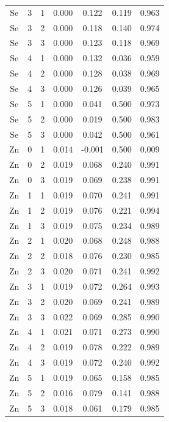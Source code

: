 \documentclass[ms, hidelinks]{uncgdissertationexp}
\theoremstyle{plain}
\theoremstyle{definition}
\theoremstyle{remark}
\begin{document}
\begin{longtable}{ccccccc}
Se & 3 & 1 & 0.000 & 0.122 & 0.119 & 0.963\\
\rowcolor{gray!6}  Se & 3 & 2 & 0.000 & 0.118 & 0.140 & 0.974\\
Se & 3 & 3 & 0.000 & 0.123 & 0.118 & 0.969\\
\rowcolor{gray!6}  Se & 4 & 1 & 0.000 & 0.132 & 0.036 & 0.959\\
Se & 4 & 2 & 0.000 & 0.128 & 0.038 & 0.969\\
\rowcolor{gray!6}  Se & 4 & 3 & 0.000 & 0.126 & 0.039 & 0.965\\
Se & 5 & 1 & 0.000 & 0.041 & 0.500 & 0.973\\
\rowcolor{gray!6}  Se & 5 & 2 & 0.000 & 0.019 & 0.500 & 0.983\\
Se & 5 & 3 & 0.000 & 0.042 & 0.500 & 0.961\\
\rowcolor{gray!6}  Zn & 0 & 1 & 0.014 & -0.001 & 0.500 & 0.009\\
Zn & 0 & 2 & 0.019 & 0.068 & 0.240 & 0.991\\
\rowcolor{gray!6}  Zn & 0 & 3 & 0.019 & 0.069 & 0.238 & 0.991\\
Zn & 1 & 1 & 0.019 & 0.070 & 0.241 & 0.991\\
\rowcolor{gray!6}  Zn & 1 & 2 & 0.019 & 0.076 & 0.221 & 0.994\\
Zn & 1 & 3 & 0.019 & 0.075 & 0.234 & 0.989\\
\rowcolor{gray!6}  Zn & 2 & 1 & 0.020 & 0.068 & 0.248 & 0.988\\
Zn & 2 & 2 & 0.018 & 0.076 & 0.230 & 0.985\\
\rowcolor{gray!6}  Zn & 2 & 3 & 0.020 & 0.071 & 0.241 & 0.992\\
Zn & 3 & 1 & 0.019 & 0.072 & 0.264 & 0.993\\
\rowcolor{gray!6}  Zn & 3 & 2 & 0.020 & 0.069 & 0.241 & 0.989\\
Zn & 3 & 3 & 0.022 & 0.069 & 0.285 & 0.990\\
\rowcolor{gray!6}  Zn & 4 & 1 & 0.021 & 0.071 & 0.273 & 0.990\\
Zn & 4 & 2 & 0.019 & 0.078 & 0.222 & 0.989\\
\rowcolor{gray!6}  Zn & 4 & 3 & 0.019 & 0.072 & 0.240 & 0.992\\
Zn & 5 & 1 & 0.019 & 0.065 & 0.158 & 0.985\\
\rowcolor{gray!6}  Zn & 5 & 2 & 0.016 & 0.079 & 0.141 & 0.988\\
Zn & 5 & 3 & 0.018 & 0.061 & 0.179 & 0.985\\*
\end{longtable}
\end{document}
